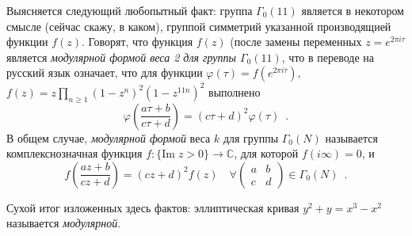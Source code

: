 \documentclass[a5paper]{article}
\theoremstyle{definition}
\newtheorem*{theorem}{Теорема}
\begin{document}
Выясняется следующий любопытный факт: группа \( \Gamma_0(11) \) является в
некотором смысле (сейчас скажу, в каком), группой симметрий указанной
производящией функции \( f(z) \). Говорят, что функция \( f(z) \) (после замены
переменных \( z = e^{2 \pi i \tau} \) является \textit{модулярной формой веса 2
для группы \( \Gamma_0(11) \)}, что в переводе на русский язык означает, что для
функции \( \varphi(\tau) = f(e^{2 \pi i \tau} ) \), \(f(z) = z \prod_{n \geq
1}(1 - z^n)^2 (1 - z^{11 n})^2 \) выполнено
\[
    \varphi\left(
        \dfrac{a\tau + b}{c \tau + d}
    \right)
     = (c \tau + d)^2 \varphi(\tau) \enspace .
\]
В общем случае, \textit{модулярной формой} веса \( k \) для группы \(
\Gamma_0(N) \) называется комплекснозначная функция \( f \colon \{\mathrm{Im}\;
z > 0\} \to \mathbb C \), для которой \(f (i \infty) = 0 \), и
\[
    f\left(
        \dfrac{az + b}{c z + d}
    \right)
     = (c z + d)^2 f(z) \quad \forall \begin{pmatrix}a & b \\ c&d
\end{pmatrix}  \in \Gamma_0(N) \enspace .
\]

Сухой итог изложенных здесь фактов: эллиптическая кривая \( y^2 + y = x^3 - x^2
\) называется \textit{модулярной}.



\end{document}
